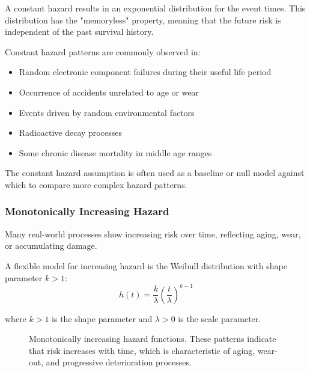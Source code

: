 A constant hazard results in an exponential distribution for the event times. This distribution has the "memoryless" property, meaning that the future risk is independent of the past survival history.

\begin{examplebox}[title=Applications of Constant Hazard Models]
Constant hazard patterns are commonly observed in:
\begin{itemize}
    \item Random electronic component failures during their useful life period
    \item Occurrence of accidents unrelated to age or wear
    \item Events driven by random environmental factors
    \item Radioactive decay processes
    \item Some chronic disease mortality in middle age ranges
\end{itemize}

The constant hazard assumption is often used as a baseline or null model against which to compare more complex hazard patterns.
\end{examplebox}

\subsubsection{Monotonically Increasing Hazard}

Many real-world processes show increasing risk over time, reflecting aging, wear, or accumulating damage.

\begin{equationbox}[title=Weibull Increasing Hazard]
A flexible model for increasing hazard is the Weibull distribution with shape parameter $k > 1$:
\begin{equation}
    h(t) = \frac{k}{\lambda}\left(\frac{t}{\lambda}\right)^{k-1}
\end{equation}

where $k > 1$ is the shape parameter and $\lambda > 0$ is the scale parameter.
\end{equationbox}

\begin{figure}[htbp]
    \centering
    \caption{Monotonically increasing hazard functions. These patterns indicate that risk increases with time, which is characteristic of aging, wear-out, and progressive deterioration processes.}
    \label{fig:increasing-hazard}
\end{figure}

